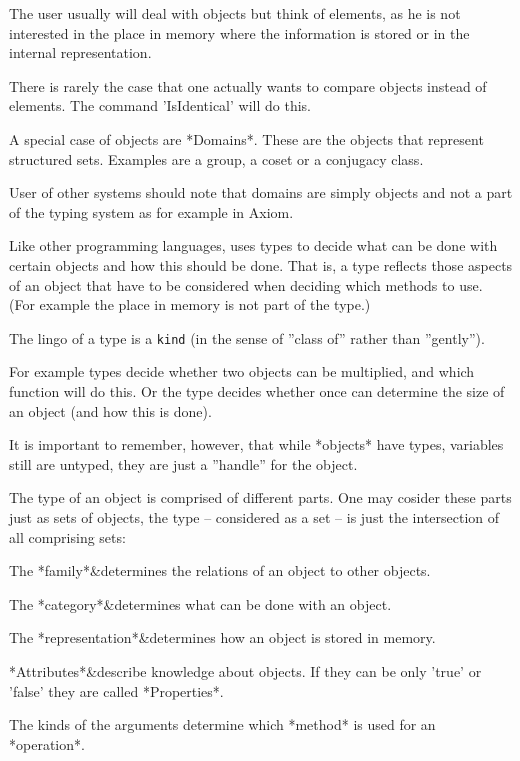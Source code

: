 The user usually will deal with objects but think of elements, as he is not
interested in the place in memory where the information is stored or in the
internal representation.

\danger
There is rarely the case that one actually wants to compare objects
instead of elements. The command 'IsIdentical' will do this.


A special case of objects are *Domains*. These are the objects that
represent structured sets.
Examples are a group, a coset or a conjugacy class.

\danger
User of other systems should note that domains
are simply objects and not a part of the typing system as for example in
Axiom.


Like other programming languages, {\GAP} uses types to decide what can be done
with certain objects and how this should be done. That is, a type reflects
those aspects of an object that have to be considered when deciding which
methods to use. (For example the place in memory is not part of the type.)

The {\GAP} lingo of a type is a {\tt kind} (in the sense of ''class of'' rather
than ''gently'').

For example types decide whether two objects can be multiplied, and which
function will do this. Or the type decides whether once can determine the
size of an object (and how this is done).

It is important to remember, however, that while *objects* have types,
variables still are untyped, they are just a ''handle'' for the object.

The type of an object is comprised of different parts. One may cosider these
parts just as sets of objects, the type -- considered as a set -- is just
the intersection of all comprising sets:

\beginitems
The *family*&determines the relations of an object to other objects.

The *category*&determines what can be done with an object.

The *representation*&determines how an object is stored in memory.

*Attributes*&describe knowledge about objects. If they can be only 'true'
or 'false' they are called *Properties*.
\enditems

The kinds of the arguments determine which *method* is used for an
*operation*.

